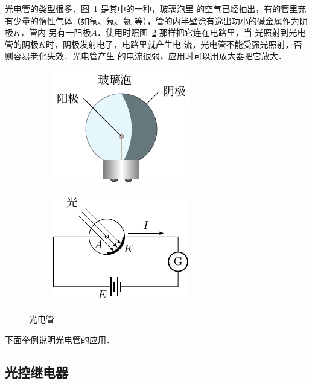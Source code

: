 光电管的类型很多．图~\ref{fig_C_7-3a} 是其中的一种，玻璃泡里
的空气已经抽出，有的管里充有少量的惰性气体（如氩、氖、氦
等），管的内半壁涂有逸出功小的碱金属作为阴极$K$，管内
另有一阳极$A$．使用时照图~\ref{fig_C_7-3b} 那样把它连在电路里，当
光照射到光电管的阴极$K$时，阴极发射电子，电路里就产生电
流，光电管不能受强光照射，否则容易老化失效．光电管产生
的电流很弱，应用时可以用放大器把它放大．
\begin{figure}[htbp]
    \centering
    \begin{subfigure}{0.4\linewidth}
        \centering
        \includegraphics{fig/C/7-3a.pdf}
        \caption{}\label{fig_C_7-3a}
    \end{subfigure}
    \hfil
    \begin{subfigure}{0.4\linewidth}
        \centering
        \includegraphics{fig/C/7-3b.pdf}
        \caption{}\label{fig_C_7-3b}
    \end{subfigure}
    \caption{光电管}\label{fig_C_7-3}
\end{figure}

下面举例说明光电管的应用．

\subsection{光控继电器}

